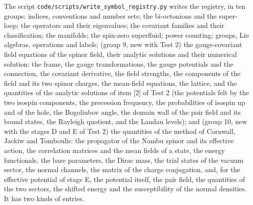 \documentclass[
  10pt,
]{article}
\begin{document}
The script \texttt{code/scripts/write\_symbol\_registry.py} writes the
registry, in ten groups: indices, conventions and number sets; the
bi-octonions and the super-loop; the operators and their eigenvalues;
the covariant families and their classification; the manifolds; the
spin-zero superfluid; power counting; groups, Lie algebras, operations
and labels; (group 9, new with Test 2) the gauge-covariant field
equations of the spinor field, their analytic solutions and their
numerical solution: the frame, the gauge transformations, the gauge
potentials and the connection, the covariant derivative, the field
strengths, the components of the field and its two spinor charges, the
mean-field equations, the lattice, and the quantities of the analytic
solutions of item {[}2{]} of Test 2 (the potentials felt by the two
isospin components, the precession frequency, the probabilities of
isospin up and of the hole, the Bogoliubov angle, the domain wall of the
pair field and its bound states, the Rayleigh quotient, and the Landau
levels); and (group 10, new with the stages D and E of Test 2) the
quantities of the method of Cornwall, Jackiw and Tomboulis: the
propagator of the Nambu spinor and its effective action, the correlation
matrices and the mean fields of a state, the energy functionals, the
bare parameters, the Dirac mass, the trial states of the vacuum sector,
the normal channels, the matrix of the charge conjugation, and, for the
effective potential of stage E, the potential itself, the pair field,
the quantities of the two sectors, the shifted energy and the
susceptibility of the normal densities. It has two kinds of entries.
\end{document}
